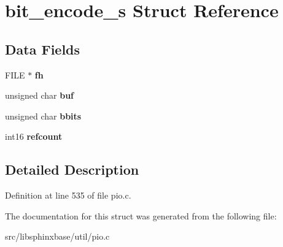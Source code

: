 \section{bit\+\_\+encode\+\_\+s Struct Reference}
\label{structbit__encode__s}
\subsection*{Data Fields}
\begin{DoxyCompactItemize}
\item 
\mbox{\label{structbit__encode__s_af0c1de2333ec798aa832e762f4ee9887}} 
F\+I\+LE $\ast$ {\bfseries fh}
\item 
\mbox{\label{structbit__encode__s_af068f9ee3624aed0b0c8720d579d2c7b}} 
unsigned char {\bfseries buf}
\item 
\mbox{\label{structbit__encode__s_a69d53d4800481f63b0c2b990472323f8}} 
unsigned char {\bfseries bbits}
\item 
\mbox{\label{structbit__encode__s_af2862417e58a196618593631fc5e9833}} 
int16 {\bfseries refcount}
\end{DoxyCompactItemize}


\subsection{Detailed Description}


Definition at line 535 of file pio.\+c.



The documentation for this struct was generated from the following file\+:\begin{DoxyCompactItemize}
\item 
src/libsphinxbase/util/pio.\+c\end{DoxyCompactItemize}
